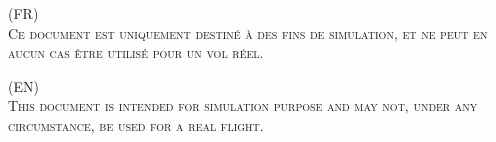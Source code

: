 \fancyhf{}
\renewcommand{\headrulewidth}{0pt}%
\renewcommand{\footrulewidth}{0pt}%
%

%

\begin{smini}
\center
\textsc{{\Huge (FR)\\ Ce document est uniquement destiné à des fins de simulation, et ne peut en aucun cas être utilisé pour un vol réel.}}

\vskip2cm

\textsc{{\Huge (EN)\\ This document is intended for simulation purpose and may not, under any circumstance, be used for a real flight.}}
\end{smini}

%